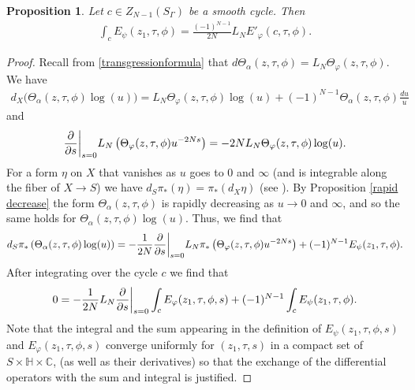 \documentclass[twoside,a4paper,10pt]{article} %
\newcommand{\dds}{\restr{\frac{\partial}{\partial s}}{s=0}}
\newcommand{\8}{\infty}
\newcommand{\HH}{\mathbb{H}}
\newcommand{\C}{\mathbb{C}}
\newcommand\restr[2]{{%
  \left.\kern-\nulldelimiterspace %
  #1 %
  \vphantom{\big|} %
  \right|_{#2} %
  }}
\theoremstyle{mytheoremstyle}
\newtheorem{prop}[thm]{Proposition}
\theoremstyle{remark}
\numberwithin{equation}{section}
\begin{document}
\begin{prop} \label{lemmaderiv} Let $c \in Z_{N-1}(S_\Gamma)$ be a smooth cycle. Then
\begin{align}
\int_{c}E_{\psi}(z_1,\tau,\phi)= \frac{(-1)^{N-1}}{2N} L_N E'_\varphi(c,\tau,\phi).
\end{align}
\end{prop}
\begin{proof} 
Recall from \eqref{transgressionformula} that $d\Theta_{\alpha}(z,\tau,\phi)=L_N \Theta_{\varphi}(z,\tau,\phi)$. We have \begin{align}
d_X \biggl ( \Theta_{\alpha}(z,\tau,\phi) \log(u)\biggr )=L_N\Theta_{\varphi}(z,\tau,\phi)\log(u)+(-1)^{N-1}\Theta_{\alpha}(z,\tau,\phi)\frac{du}{u}
\end{align}
and
\begin{align}
\dds L_N \left (\Theta_{\varphi}(z,\tau,\phi)u^{-2Ns}\right )=-2NL_N\Theta_{\varphi}(z,\tau,\phi)\log(u).
\end{align}
For a form $\eta$ on $X$ that vanishes as $u$ goes to $0$ and $\8$ (and is integrable along the fiber of $X \rightarrow S$) we have $d_S\pi_\ast(\eta)=\pi_\ast(d_X\eta)$ (see \cite[Lemma.~3.9]{rbrsln}). By Proposition \ref{rapid decrease} the form $\Theta_{\alpha}(z,\tau,\phi)$ is rapidly decreasing as $u \rightarrow 0$ and $\8$, and so the same holds for $\Theta_{\alpha}(z,\tau,\phi)\log(u)$.
Thus, we find that
\begin{align}
d_S\pi_\ast \left ( \Theta_{\alpha}(z,\tau,\phi) \log(u) \right )=-\frac{1}{2N}\dds L_N \pi_\ast \left (\Theta_{\varphi}(z,\tau,\phi)u^{-2Ns}\right )+(-1)^{N-1}E_{\psi}(z_1,\tau,\phi).
\end{align}
After integrating over the cycle $c$ we find that
\begin{align}
0=-\frac{1}{2N}L_N \dds \int_c E_{\varphi}(z_1,\tau,\phi,s)+(-1)^{N-1}\int_{c}E_{\psi}(z_1,\tau,\phi).
\end{align}
Note that the integral and the sum appearing in the definition of $E_\psi(z_1,\tau,\phi,s)$ and $E_\varphi(z_1,\tau,\phi,s)$ converge uniformly for $(z_1,\tau,s)$ in a compact set of $S \times \HH \times \C$, (as well as their derivatives) so that the exchange of the differential operators with the sum and integral is justified.
\end{proof}
\end{document}
